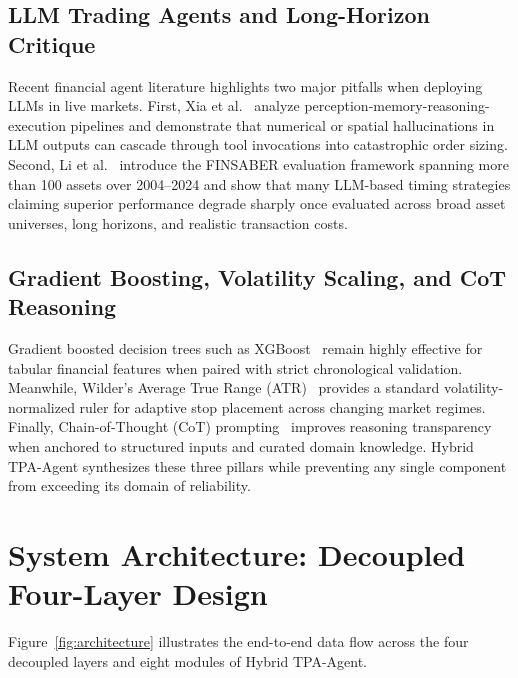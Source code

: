 \documentclass[conference]{IEEEtran}
\begin{document}
\subsection{LLM Trading Agents and Long-Horizon Critique}
Recent financial agent literature highlights two major pitfalls when deploying LLMs in live markets. First, Xia et al.~\cite{xia2026agentic} analyze perception-memory-reasoning-execution pipelines and demonstrate that numerical or spatial hallucinations in LLM outputs can cascade through tool invocations into catastrophic order sizing. Second, Li et al.~\cite{li2026finsaber} introduce the FINSABER evaluation framework spanning more than 100 assets over 2004--2024 and show that many LLM-based timing strategies claiming superior performance degrade sharply once evaluated across broad asset universes, long horizons, and realistic transaction costs.

\subsection{Gradient Boosting, Volatility Scaling, and CoT Reasoning}
Gradient boosted decision trees such as XGBoost~\cite{chen2016xgboost} remain highly effective for tabular financial features when paired with strict chronological validation. Meanwhile, Wilder's Average True Range (ATR)~\cite{wilder1978new} provides a standard volatility-normalized ruler for adaptive stop placement across changing market regimes. Finally, Chain-of-Thought (CoT) prompting~\cite{wei2022chainofthought} improves reasoning transparency when anchored to structured inputs and curated domain knowledge. Hybrid TPA-Agent synthesizes these three pillars while preventing any single component from exceeding its domain of reliability.

\section{System Architecture: Decoupled Four-Layer Design}
Figure~\ref{fig:architecture} illustrates the end-to-end data flow across the four decoupled layers and eight modules of Hybrid TPA-Agent.
\end{document}
